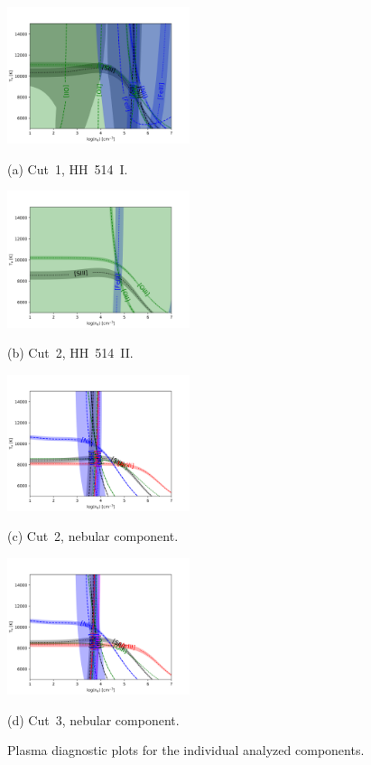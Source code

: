 \documentclass[fleqn,usenatbib]{mnras}
\begin{document}
\begin{figure}
  \begin{minipage}{7.5cm}
    \centering\includegraphics[height=4cm,width=\columnwidth]{HH514I.png}
    \centerline{(a) Cut~1, HH~514~I.}
  \end{minipage}
  \begin{minipage}{7.5cm}
     \centering\includegraphics[height=4cm,width=\columnwidth]{HH514II.png}
    \centerline{(b) Cut~2, HH~514~II.}
  \end{minipage}
 
  \begin{minipage}{7.5cm}
   \centering\includegraphics[height=4cm,width=\columnwidth]{neb_cut2.png}
   \centerline{(c) Cut~2, nebular component.}
  \end{minipage}
  \begin{minipage}{7.5cm}
    \centering\includegraphics[height=4cm,width=\columnwidth]{neb_cut3.png}
    \centerline{(d) Cut~3, nebular component.}
  \end{minipage}
  \caption{Plasma diagnostic plots for the individual analyzed components.}
\label{fig:plasma}
\end{figure}
\end{document}
